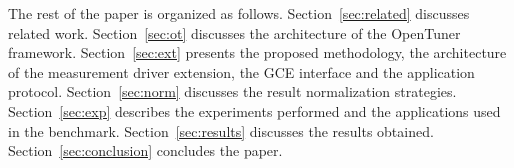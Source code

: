 The rest of the paper is organized as follows.
Section~\ref{sec:related} discusses related work.
Section~\ref{sec:ot} discusses the architecture of the OpenTuner framework.
Section~\ref{sec:ext} presents the proposed methodology, the architecture of 
the measurement driver extension, the GCE interface and the application 
protocol.
Section~\ref{sec:norm} discusses the result normalization strategies.
Section~\ref{sec:exp} describes the experiments performed and the
applications used in the benchmark.
Section~\ref{sec:results} discusses the results obtained.
Section~\ref{sec:conclusion} concludes the paper.
